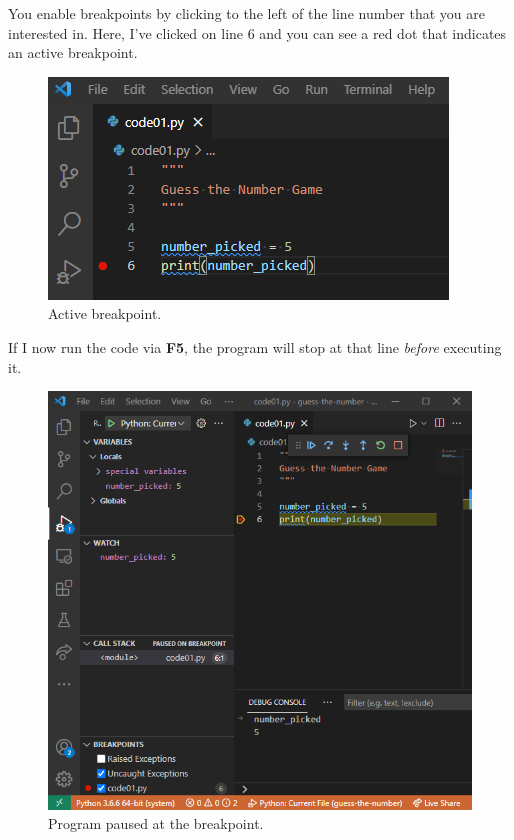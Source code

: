 \documentclass[
]{book}
\begin{document}
You enable breakpoints by clicking to the left of the line number that you are interested in. Here, I've clicked on line 6 and you can see a red dot that indicates an active breakpoint.

\begin{figure}
\centering
\includegraphics{images/debug-breakpoint.png}
\caption{Active breakpoint.}
\end{figure}

If I now run the code via \textbf{F5}, the program will stop at that line \emph{before} executing it.

\begin{figure}
\centering
\includegraphics{images/debug-pause.png}
\caption{Program paused at the breakpoint.}
\end{figure}
\end{document}
